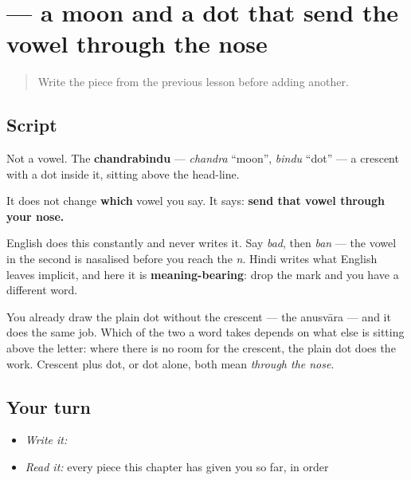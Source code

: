 \section[\texorpdfstring{\hi{ँ} (-ṁ)}{ँ (-ṁ)}]{ — a moon and a dot that send the vowel through the nose}

\label{lesson:HI-W12-chandrabindu}



\begin{quote}
Write the piece from the previous lesson before adding another.
\end{quote}

\subsection*{Script}

\begin{quote}
\end{quote}

Not a vowel. The \textbf{chandrabindu} — \emph{chandra} \textquotedblleft{}moon\textquotedblright{}, \emph{bindu} \textquotedblleft{}dot\textquotedblright{} — a crescent with a dot inside it, sitting above the head-line.

It does not change \textbf{which} vowel you say. It says: \textbf{send that vowel through your nose.}

English does this constantly and never writes it. Say \emph{bad}, then \emph{ban} — the vowel in the second is nasalised before you reach the \emph{n}. Hindi writes what English leaves implicit, and here it is \textbf{meaning-bearing}: drop the mark and you have a different word.

You already draw the plain dot without the crescent — the anusvāra — and it does the same job. Which of the two a word takes depends on what else is sitting above the letter: where there is no room for the crescent, the plain dot does the work. Crescent plus dot, or dot alone, both mean \emph{through the nose}.

\subsection*{Your turn}
\begin{itemize}
\raggedright
  \item \emph{Write it:} 
  \item \emph{Read it:} every piece this chapter has given you so far, in order
\end{itemize}

